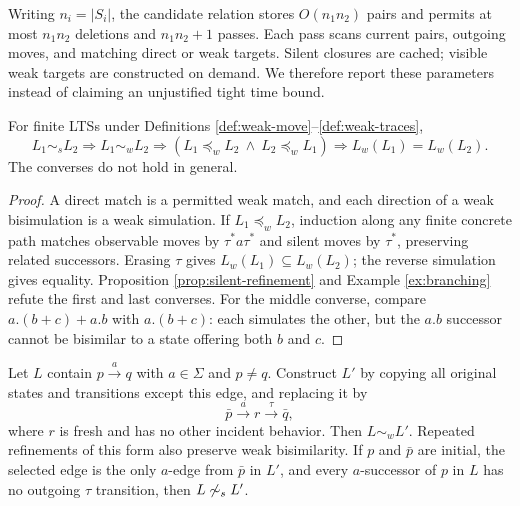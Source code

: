 \documentclass{ws-jbcb}
\numberwithin{equation}{section}
\newcommand{\TAU}{\tau}
\newcommand{\strongsim}{\mathrel{\sim_{s}}}
\newcommand{\weaksim}{\mathrel{\sim_{w}}}
\newcommand{\weakpre}{\mathrel{\preceq_{w}}}
\begin{document}
\begin{remark}\label{rem:complexity}
Writing $n_i=|S_i|$, the candidate relation stores $O(n_1n_2)$ pairs and permits
at most $n_1n_2$ deletions and $n_1n_2+1$ passes. Each pass scans current pairs,
outgoing moves, and matching direct or weak targets. Silent closures are cached;
visible weak targets are constructed on demand. We therefore report these
parameters instead of claiming an unjustified tight time bound.
\end{remark}

\begin{proposition}\label{prop:hierarchy}
For finite LTSs under Definitions \ref{def:weak-move}--\ref{def:weak-traces},
\begin{equation}\label{eq:hierarchy}
L_1\strongsim L_2
\Longrightarrow L_1\weaksim L_2
\Longrightarrow
(L_1\weakpre L_2\ \land\ L_2\weakpre L_1)
\Longrightarrow L_w(L_1)=L_w(L_2).
\end{equation}
The converses do not hold in general.
\end{proposition}

\begin{proof}
A direct match is a permitted weak match, and each direction of a weak
bisimulation is a weak simulation. If $L_1\weakpre L_2$, induction along any
finite concrete path matches observable moves by $\TAU^*a\TAU^*$ and silent
moves by $\TAU^*$, preserving related successors. Erasing $\TAU$ gives
$L_w(L_1)\subseteq L_w(L_2)$; the reverse simulation gives equality.
Proposition \ref{prop:silent-refinement} and Example \ref{ex:branching} refute
the first and last converses. For the middle converse, compare
$a.(b+c)+a.b$ with $a.(b+c)$: each simulates the other, but the $a.b$ successor
cannot be bisimilar to a state offering both $b$ and $c$.
\end{proof}

\begin{proposition}
\label{prop:silent-refinement}
Let $L$ contain $p\xrightarrow{a}q$ with $a\in\Sigma$ and $p\neq q$. Construct
$L'$ by copying all original states and transitions except this edge, and replacing
it by
\begin{equation}\label{eq:silent-refinement}
 \bar p\xrightarrow{a}r\xrightarrow{\TAU}\bar q,
\end{equation}
where $r$ is fresh and has no other incident behavior. Then $L\weaksim L'$.
Repeated refinements of this form also preserve weak bisimilarity. If $p$ and
$\bar p$ are initial, the selected edge is the only $a$-edge from $\bar p$ in
$L'$, and every $a$-successor of $p$ in $L$ has no outgoing $\TAU$ transition,
then $L\not\strongsim L'$.
\end{proposition}
\end{document}
